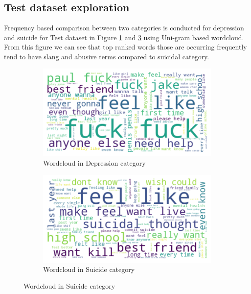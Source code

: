 \documentclass[sn-mathphys,Numbered]{sn-jnl}%
\theoremstyle{thmstyleone}%
\theoremstyle{thmstyletwo}%
\theoremstyle{thmstylethree}%
\begin{document}
\subsection{Test dataset exploration}
Frequency based comparison between two categories is conducted for depression and suicide for Test dataset in Figure \ref{dep_wordcloud_test} and \ref{sui_wordcloud_test} using Uni-gram based wordcloud. From this figure we can see that top ranked words those are occurring frequently tend to have slang and abusive terms compared to suicidal category. 
\begin{figure}[H]
\centering
\begin{subfigure}{0.45\textwidth}
    \includegraphics[width=\textwidth]{dep_wordcloud.png}
    \caption{Wordcloud in Depression category}
    \label{dep_wordcloud_test}
\end{subfigure}
\hfill
\begin{subfigure}{0.45\textwidth}
    \includegraphics[width=\textwidth]{sui_wordcloud.png}
    \caption{Wordcloud in Suicide category}
    \label{sui_wordcloud_test}
\end{subfigure}
\end{figure}
\end{document}
